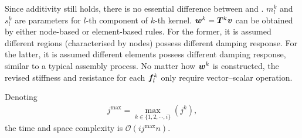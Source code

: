 Since additivity still holds, there is no essential difference between  and . $m_l^k$ and $s_l^k$ are parameters for $l$-th component of $k$-th kernel. $\bm{w}^k=\bm{T}^k\bm{v}$ can be obtained by either node-based or element-based rules. For the former, it is assumed different regions (characterised by nodes) possess different damping response. For the latter, it is assumed different elements possess different damping response, similar to a typical assembly process. No matter how $\bm{w}^k$ is constructed, the revised stiffness and resistance for each $\bm{f}_l^k$ only require vector--scalar operation.

Denoting
\begin{gather}
j^\text{max}=\max_{k\in\{1,2,\cdots,i\}}\left(j^k\right),
\end{gather}
the time and space complexity is $\mathcal{O}\left(ij^\text{max}n\right)$.
